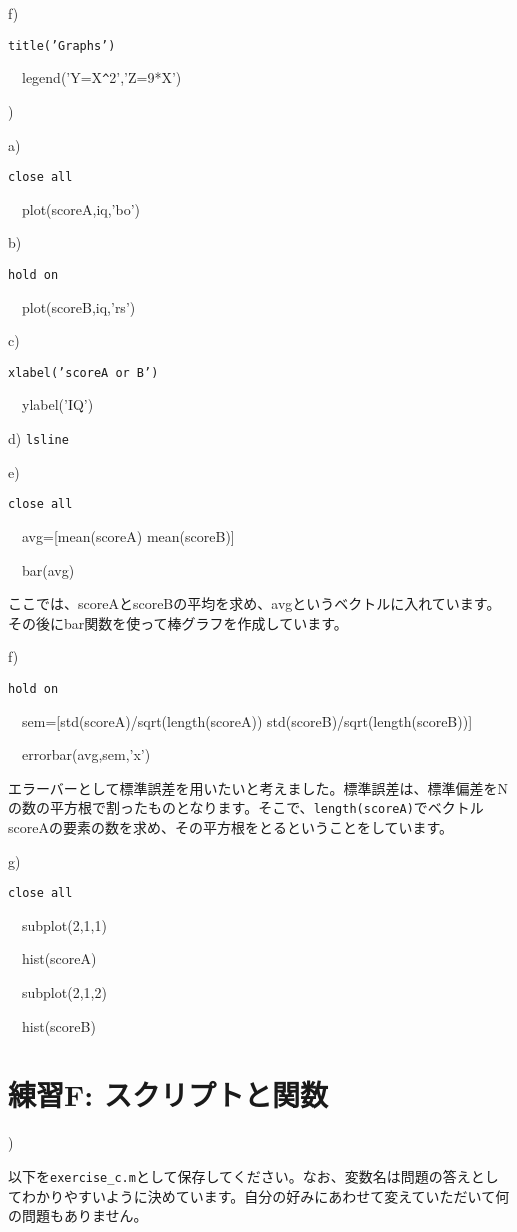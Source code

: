 \documentclass{jsarticle}
\begin{document}
f) {\tt title('Graphs')

\ \ legend('Y=X\verb|^|2','Z=9*X')
}

\bigskip

)

a) {\tt close all

\ \ plot(scoreA,iq,'bo')}

b) {\tt hold on

\ \ plot(scoreB,iq,'rs')}

c) {\tt xlabel('scoreA or B')

\ \ ylabel('IQ')}

d) {\tt lsline}

e) {\tt close all

\ \ avg=[mean(scoreA) mean(scoreB)]

\ \ bar(avg)}

\begin{screen}
ここでは、scoreAとscoreBの平均を求め、avgというベクトルに入れています。
その後にbar関数を使って棒グラフを作成しています。
\end{screen}

f) {\tt hold on

\ \ sem=[std(scoreA)/sqrt(length(scoreA)) std(scoreB)/sqrt(length(scoreB))]

\ \ errorbar(avg,sem,'x')}

\begin{screen}
エラーバーとして標準誤差を用いたいと考えました。標準誤差は、標準偏差をNの数の平方根で割ったものとなります。そこで、{\tt length(scoreA)}でベクトルscoreAの要素の数を求め、その平方根をとるということをしています。
\end{screen}

g) {\tt close all

\ \ subplot(2,1,1)

\ \ hist(scoreA)

\ \ subplot(2,1,2)

\ \ hist(scoreB)
}

\section{練習F: スクリプトと関数}

)

\begin{screen}
以下を{\tt exercise\_c.m}として保存してください。なお、変数名は問題の答えとしてわかりやすいように決めています。自分の好みにあわせて変えていただいて何の問題もありません。
\end{screen}
\end{document}
